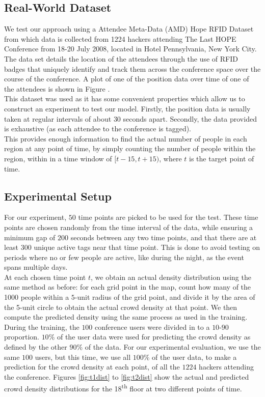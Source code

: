\documentclass[letterpaper]{article}
\begin{document}
\subsection{Real-World Dataset}

We test our approach using a Attendee Meta-Data (AMD) Hope RFID Dataset from which data is collected from 1224 hackers attending The Last HOPE Conference from 18-20 July 2008, located in Hotel Pennsylvania, New York City.\\

The data set details the location of the attendees through the use of RFID badges that uniquely identify and track them across the conference space over the course of the conference. A plot of one of the position data over time of one of the attendees is shown in Figure .\\

This dataset was used as it has some convenient properties which allow us to construct an experiment to test our model. Firstly, the position data is usually taken at regular intervals of about $30$ seconds apart. Secondly, the data provided is exhaustive (as each attendee to the conference is tagged). \\

This provides enough information to find the actual number of people in each region at any point of time, by simply counting the number of people within the region, within in a time window of $[t-15,t+15)$, where $t$ is the target point of time.

\subsection{Experimental Setup}

For our experiment, $50$ time points are picked to be used for the test. These time points are chosen randomly from the time interval of the data, while ensuring a minimum gap of $200$ seconds between any two time points, and that there are at least $300$ unique active tags near that time point. This is done to avoid testing on periods where no or few people are active, like during the night, as the event spans multiple days.\\

At each chosen time point $t$, we obtain an actual density distribution using the same method as before: for each grid point in the map, count how many of the 1000 people within a $5$-unit radius of the grid point, and divide it by the area of the 5-unit circle to obtain the actual crowd density at that point. We then compute the predicted density using the same process as used in the training. During the training, the $100$ conference users were divided in to a $10$-$90$ proportion. $10\%$ of the user data were used for predicting the crowd density as defined by the other $90\%$ of the data. For our experimental evaluation, we use the same $100$ users, but this time, we use all $100\%$ of the user data, to make a prediction for the crowd density at each point, of all the $1224$ hackers attending the conference. Figures \ref{fig:t1dist} to \ref{fig:t2dist} show the actual and predicted crowd density distributions for the 18\textsuperscript{th} floor at two different points of time.\\
\end{document}
